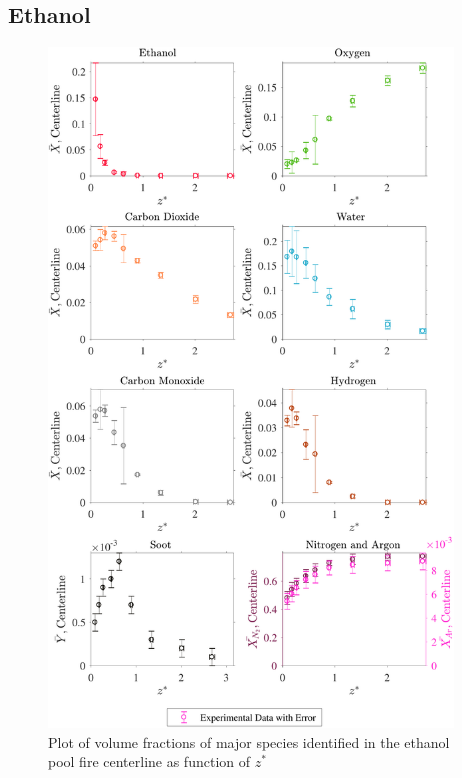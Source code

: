 \documentclass[12pt]{article}
\begin{document}
\subsection{Ethanol}
\label{ssec:Ethanol_ALL_Vol_Frac}

\begin{figure}[!h]
	\centering
\includegraphics[width=10.75cm,keepaspectratio]{Ethanol_MOL_FRAC_Plot.pdf}
	\caption[Volume fractions of major species in the ethanol plume]{Plot of volume fractions of major species identified in the ethanol pool fire centerline as function of $z^{*}$}
	\label{fig:Ethanol_VOL_Frac_Major}
\end{figure}
\pagebreak
\end{document}
